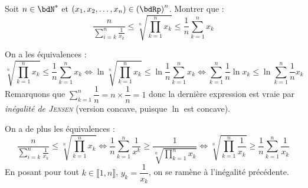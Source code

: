 \documentclass[a4paper,french,bookmarks]{report}
\begin{document}
\begin{exercise}{}{}
    Soit $n \in \bdN^*$ et $(x_1, x_2, \dots, x_n) \in \left(\bdRp\right)^n$. Montrer que :
    \[ \dfrac{n}{\displaystyle\sum_{i=k}^n \frac{1}{x_k}} \leq \sqrt[n]{\prod_{k=1}^n x_k} \leq \dfrac{1}{n}\sum_{k=1}^n x_k\]
    \begin{enumerate}
        \itt On a les équivalences :
        \[ \sqrt[n]{\prod_{k=1}^n x_k} \leq \dfrac{1}{n}\sum_{k=1}^n x_k \iff \ln{\sqrt[n]{\prod_{k=1}^n x_k}} \leq \ln{\dfrac{1}{n}\sum_{k=1}^n x_k} \iff \sum_{k=1}^n \dfrac{1}{n}\ln{x_k} \leq \ln{\sum_{k=1}^n \dfrac{1}{n} x_k}\]
        Remarquons que $\displaystyle\sum_{k=1}^n \dfrac{1}{n} = n\times \dfrac{1}{n} = 1$ donc la dernière expression est vraie par \textit{inégalité de \textsc{Jensen}} (version concave, puisque $\ln$ est concave).
        
        \itt On a de plus les équivalences :
        \[ \dfrac{n}{\displaystyle\sum_{i=k}^n \frac{1}{x_k}} \leq \sqrt[n]{\prod_{k=1}^n x_k} \iff \dfrac{1}{n}\sum_{k=1}^n \dfrac{1}{x^k} \geq \dfrac{1}{\sqrt[n]{\displaystyle\prod_{k=1}^n x_k}} \iff \sqrt[n]{\prod_{k=1}^n \dfrac{1}{x_k}} \geq \dfrac{1}{n}\sum_{k=1}^n \dfrac{1}{x_k}\]
        En posant pour tout $k \in \llbracket 1, n \rrbracket$, $y_k = \dfrac{1}{x_k}$, on se ramène à l'inégalité précédente.
    \end{enumerate}
\end{exercise}
\end{document}
